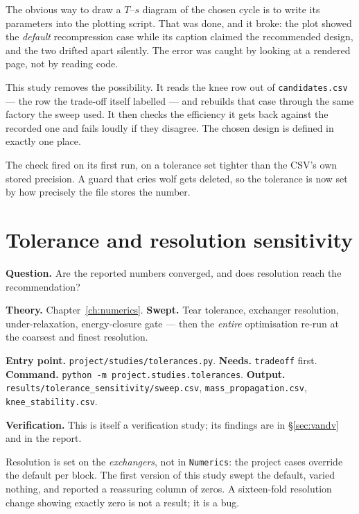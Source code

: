 \documentclass[11pt,a4paper]{report}
\newcommand{\code}[1]{\texttt{\small #1}}
\begin{document}
\begin{choicebox}[title={Implementation: why this study exists at all}]
The obvious way to draw a $T$--$s$ diagram of the chosen cycle is to
write its parameters into the plotting script. That was done, and it
broke: the plot showed the \emph{default} recompression case while its
caption claimed the recommended design, and the two drifted apart
silently. The error was caught by looking at a rendered page, not by
reading code.

This study removes the possibility. It reads the knee row out of
\code{candidates.csv} --- the row the trade-off itself labelled --- and
rebuilds that case through the same factory the sweep used. It then
checks the efficiency it gets back against the recorded one and fails
loudly if they disagree. The chosen design is defined in exactly one
place.

The check fired on its first run, on a tolerance set tighter than the
CSV's own stored precision. A guard that cries wolf gets deleted, so the
tolerance is now set by how precisely the file stores the number.
\end{choicebox}

\section{Tolerance and resolution sensitivity}

\textbf{Question.} Are the reported numbers converged, and does
resolution reach the recommendation?

\textbf{Theory.} Chapter~\ref{ch:numerics}.
\textbf{Swept.} Tear tolerance, exchanger resolution, under-relaxation,
energy-closure gate --- then the \emph{entire} optimisation re-run at the
coarsest and finest resolution.

\textbf{Entry point.} \code{project/studies/tolerances.py}.
\textbf{Needs.} \code{tradeoff} first.
\textbf{Command.} \code{python -m project.studies.tolerances}.
\textbf{Output.} \code{results/tolerance\_sensitivity/sweep.csv},
\code{mass\_propagation.csv}, \code{knee\_stability.csv}.

\textbf{Verification.} This is itself a verification study; its findings
are in \S\ref{sec:vandv} and in the report.

\begin{caveat}
Resolution is set on the \emph{exchangers}, not in \code{Numerics}: the
project cases override the default per block. The first version of this
study swept the default, varied nothing, and reported a reassuring
column of zeros. A sixteen-fold resolution change showing exactly zero
is not a result; it is a bug.
\end{caveat}
\end{document}
